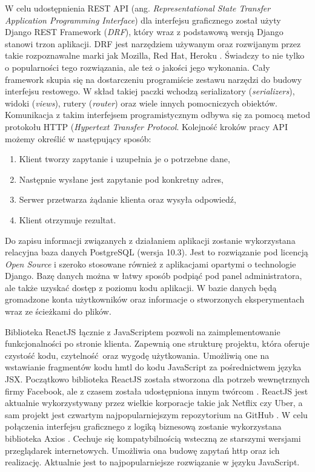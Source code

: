 W celu udostępnienia REST API (ang. \textit{Representational State Transfer Application Programming Interface}) dla interfejsu graficznego został użyty Django REST Framework (\textit{DRF}), który wraz z podstawową wersją Django stanowi trzon aplikacji. DRF jest narzędziem używanym oraz rozwijanym przez takie rozpoznawalne marki jak  Mozilla, Red Hat, Heroku \cite{misc_django_rest}. Świadczy to nie tylko o popularności tego rozwiązania, ale też o jakości jego wykonania. Cały framework skupia się na dostarczeniu programiście zestawu narzędzi do budowy interfejsu restowego. W skład takiej paczki wchodzą serializatory (\textit{serializers}), widoki (\textit{views}), rutery (\textit{router}) oraz wiele innych pomocniczych obiektów. Komunikacja z takim interfejsem programistycznym odbywa się za pomocą metod protokołu HTTP (\textit{Hypertext Transfer Protocol}. Kolejność kroków pracy API możemy określić w następujący sposób:
\begin{enumerate}
	\item Klient tworzy zapytanie i uzupełnia je o potrzebne dane, 
	\item Następnie wysłane jest zapytanie pod konkretny adres,
	\item Serwer przetwarza żądanie klienta oraz wysyła odpowiedź,
	\item Klient otrzymuje rezultat.
\end{enumerate}

Do zapisu informacji związanych z działaniem aplikacji zostanie wykorzystana relacyjna baza danych PostgreSQL (wersja 10.3). Jest to rozwiązanie pod licencją \textit{Open Source} i szeroko stosowane również z aplikacjami opartymi o technologie Django. Bazę danych można w łatwy sposób podpiąć pod panel administratora, ale także uzyskać dostęp z poziomu kodu aplikacji. W bazie danych będą gromadzone konta użytkowników oraz informacje o stworzonych eksperymentach wraz ze ścieżkami do plików. 

Biblioteka ReactJS łącznie z JavaScriptem pozwoli na zaimplementowanie funkcjonalności po stronie klienta. Zapewnią one strukturę projektu, która oferuje czystość kodu, czytelność oraz wygodę użytkowania. Umożliwią one na wstawianie fragmentów kodu hmtl do kodu JavaScript za pośrednictwem języka JSX. Początkowo biblioteka ReactJS została stworzona dla potrzeb wewnętrznych firmy Facebook, ale z czasem została udostępniona innym twórcom \cite{misc_react}. ReactJS jest aktualnie wykorzystywany przez wielkie korporacje takie jak Netflix czy Uber, a sam projekt jest czwartym najpopularniejszym repozytorium na GitHub \cite{misc_react_pop}. W celu połączenia interfejsu graficznego z logiką biznesową zostanie wykorzystana biblioteka Axios \cite{misc_axios}. Cechuje się kompatybilnością wsteczną ze starszymi wersjami przeglądarek internetowych. Umożliwia ona budowę zapytań http oraz ich realizację. Aktualnie jest to najpopularniejsze rozwiązanie w języku JavaScript. 

